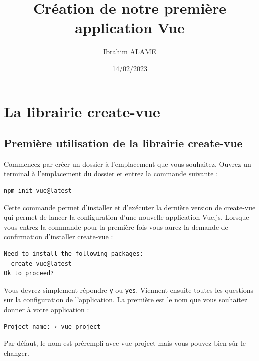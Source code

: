 \documentclass{article}
\title{Création de notre première application Vue}
\author{Ibrahim ALAME}
\date{14/02/2023}
\begin{document}
\maketitle

\section{La librairie create-vue}
\subsection{Première utilisation de la librairie {\color{monOrange} create-vue}}
Commencez par créer un dossier à l'emplacement que vous souhaitez. Ouvrez un terminal à l'emplacement du dossier et entrez la commande suivante :
\begin{verbatim}
npm init vue@latest
\end{verbatim}

Cette commande permet d'installer et d'exécuter la dernière version de {\color{monOrange}create-vue} qui permet de lancer la configuration d'une nouvelle application {\color{monOrange} Vue.js}. Lorsque vous entrez la commande pour la première fois vous aurez la demande de confirmation d'installer {\color{monOrange}create-vue }:
\begin{verbatim}
Need to install the following packages:
  create-vue@latest
Ok to proceed?
\end{verbatim}

Vous devrez simplement répondre {\tt y} ou {\tt yes}. Viennent ensuite toutes les questions sur la configuration de l'application. La première est le nom que vous souhaitez donner à votre application :
\begin{verbatim}
Project name: › vue-project
\end{verbatim}

Par défaut, le nom est prérempli avec vue-project mais vous pouvez bien sûr le changer.
\end{document}
